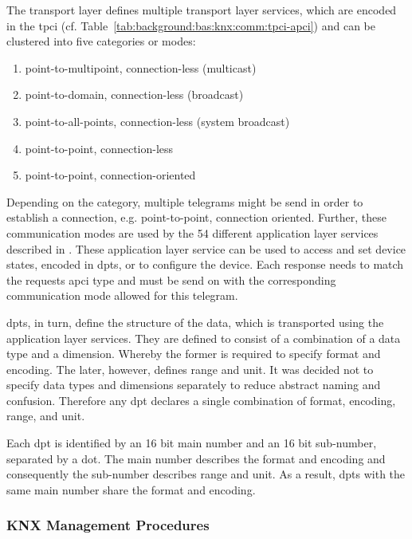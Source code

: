 The transport layer defines multiple transport layer services, which are encoded in the \gls{tpci} (cf. Table~\ref{tab:background:bas:knx:comm:tpci-apci}) and can be clustered into five categories or modes:

\begin{enumerate}
	\item point-to-multipoint, connection-less (multicast)
	\item point-to-domain, connection-less (broadcast)
	\item point-to-all-points, connection-less (system broadcast)
	\item point-to-point, connection-less
	\item point-to-point, connection-oriented
\end{enumerate}
\parencite[p.~30]{DIN_EN_50090-4-2}

Depending on the category, multiple telegrams might be send in order to establish a connection, e.g. point-to-point, connection oriented.
Further, these communication modes are used by the \alert{54} different application layer services described in \textcite{DIN_EN_50090-4-1}.
These application layer service can be used to access and set device states, encoded in \glspl{dpt}, or to configure the device.
Each response needs to match the requests \gls{apci} type and must be send on with the corresponding communication mode allowed for this telegram. \parencite[pp.~9--10]{DIN_EN_50090-4-1}

\glspl{dpt}, in turn, define the structure of the data, which is transported using the application layer services.
They are defined to consist of a combination of a data type and a dimension. Whereby the former is required to specify format and encoding. The later, however, defines range and unit.
It was decided not to specify data types and dimensions separately to reduce abstract naming and confusion.
Therefore any \gls{dpt} declares a single combination of format, encoding, range, and unit. \parencite[p.~38]{DIN_EN_50090-3-3}

Each \gls{dpt} is identified by an 16 bit main number and an 16 bit sub-number, separated by a dot. The main number describes the format and encoding and consequently the sub-number describes range and unit. As a result, \glspl{dpt} with the same main number share the format and encoding.


	
\subsubsection{KNX Management Procedures}
\label{sec:background:bas:knx:management}

